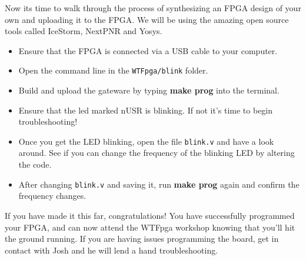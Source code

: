 \documentclass[12pt,a4paper]{article}
\begin{document}
\noindent
Now its time to walk through the process of synthesizing an FPGA design of your own and uploading it to the FPGA. We will be using the amazing open source tools called IceStorm, NextPNR and Yosys. 
\begin{itemize}
		\item Ensure that the FPGA is connected via a USB cable to your computer. 
		\item Open the command line in the \texttt{WTFpga/blink} folder.
		\item Build and upload the gateware by typing \textbf{make prog} into the terminal. 
		\item Ensure that the led marked nUSR is blinking. If not it's time to begin troubleshooting!
		\item Once you get the LED blinking, open the file \texttt{blink.v} and have a look around. See if you can change the frequency of the blinking LED by altering the code. 
		\item After changing \texttt{blink.v} and saving it, run \textbf{make prog} again and confirm the frequency changes. 
\end{itemize}
If you have made it this far, congratulations! You have successfully programmed your FPGA, and can now attend the WTFpga workshop knowing that you'll hit the ground running. If you are having issues programming the board, get in contact with Josh and he will lend a hand troubleshooting. 
\end{document}
